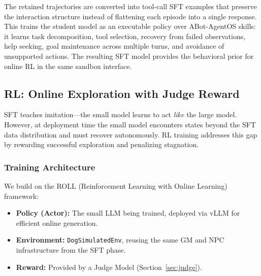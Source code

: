 

The retained trajectories are converted into tool-call SFT examples that
preserve the interaction structure instead of flattening each episode
into a single response. This trains the student model as an executable
policy over ABot-AgentOS skills: it learns task decomposition, tool
selection, recovery from failed observations, help seeking, goal
maintenance across multiple turns, and avoidance of unsupported actions.
The resulting SFT model provides the behavioral prior for online RL in
the same sandbox interface.



\iffalse
\subsection{RL: Online Exploration with Judge Reward}
\label{sec:rl}


SFT teaches imitation---the small model learns to act \emph{like} the large model. However, at deployment time the small model encounters states beyond the SFT data distribution and must recover autonomously. RL training addresses this gap by rewarding successful exploration and penalizing stagnation.

\subsubsection{Training Architecture}

We build on the ROLL (Reinforcement Learning with Online Learning) framework:

\begin{itemize}
    \item \textbf{Policy (Actor):} The small LLM being trained, deployed via vLLM for efficient online generation.
    \item \textbf{Environment:} \texttt{DogSimulatedEnv}, reusing the same GM and NPC infrastructure from the SFT phase.
    \item \textbf{Reward:} Provided by a Judge Model (Section~\ref{sec:judge}).
\end{itemize}


